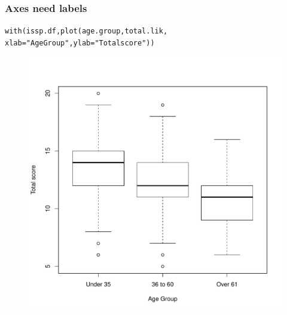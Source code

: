 \documentclass{beamer}\usepackage[]{graphicx}\usepackage[]{color}
\makeatletter
\newcommand{\hlstr}[1]{\textcolor[rgb]{0.667,0.267,0}{#1}}%
\newcommand{\hlstd}[1]{\textcolor[rgb]{0,0,0}{#1}}%
\newcommand{\hlkwc}[1]{\textcolor[rgb]{0,0,0.4}{#1}}%
\newcommand{\hlkwd}[1]{\textcolor[rgb]{0,0.267,0.4}{#1}}%
\newenvironment{kframe}{%
 \def\at@end@of@kframe{}%
 \ifinner\ifhmode%
  \def\at@end@of@kframe{\end{minipage}}%
  \begin{minipage}{\columnwidth}%
 \fi\fi%
 \def\FrameCommand##1{\hskip\@totalleftmargin \hskip-\fboxsep
 \colorbox{shadecolor}{##1}\hskip-\fboxsep
     \hskip-\linewidth \hskip-\@totalleftmargin \hskip\columnwidth}%
 \MakeFramed {\advance\hsize-\width
   \@totalleftmargin\z@ \linewidth\hsize
   \@setminipage}}%
 {\par\unskip\endMakeFramed%
 \at@end@of@kframe}
\newenvironment{knitrout}{}{} %
\makeatother
\begin{document}
\begin{frame}[fragile]
  \frametitle{Axes need labels}
\begin{knitrout}
\color{fgcolor}\begin{kframe}
\begin{alltt}
\hlkwd{with}\hlstd{(issp.df,} \hlkwd{plot}\hlstd{(age.group, total.lik,}
    \hlkwc{xlab} \hlstd{=} \hlstr{"Age Group"}\hlstd{,} \hlkwc{ylab} \hlstd{=} \hlstr{"Total score"}\hlstd{))}
\end{alltt}
\end{kframe}
\end{knitrout}

\begin{figure}[h]
  \vspace{-25pt}
  \centering
  \includegraphics[height = 0.6\textwidth, keepaspectratio]{Figure/box3}
  \label{fig:box3}
\end{figure}
\end{frame}
\end{document}
